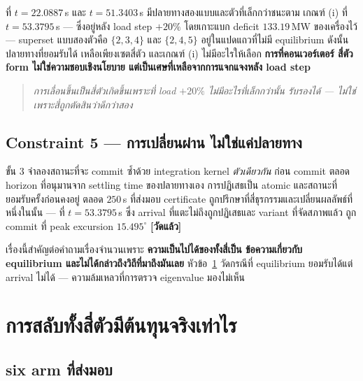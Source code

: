 \documentclass[12pt,a4paper]{article}
\theoremstyle{remark}
\newcommand{\measured}{\textcolor{ok}{\textbf{[วัดแล้ว]}}}
\begin{document}
ที่ $t=22.0887$\,s และ $t=51.3403$\,s มีปลายทางสองแบบและตัวที่เล็กกว่าชนะตาม
เกณฑ์ (i) ที่ $t=53.3795$\,s --- ซึ่งอยู่หลัง load step $+20\%$ โดยเกาะแบก
deficit $133.19$\,MW ของเครื่องไว้ --- superset แบบสองตัวคือ $\{2,3,4\}$ และ
$\{2,4,5\}$ อยู่ในแปดแถวที่ไม่มี equilibrium ดังนั้นปลายทางที่ยอมรับได้
เหลือเพียงเซตสี่ตัว และเกณฑ์ (i) ไม่มีอะไรให้เลือก \textbf{การที่คอนเวอร์เตอร์
สี่ตัว form ไม่ใช่ความชอบเชิงนโยบาย แต่เป็นเศษที่เหลือจากการแจกแจงหลัง
load step}

\begin{quote}\small\itshape
การเลื่อนขึ้นเป็นสี่ตัวเกิดขึ้นเพราะที่ load $+20\%$ ไม่มีอะไรที่เล็กกว่านั้น
รับรองได้ --- ไม่ใช่เพราะสี่ถูกตัดสินว่าดีกว่าสอง
\end{quote}

\subsection{Constraint 5 --- การเปลี่ยนผ่าน ไม่ใช่แค่ปลายทาง}

ขั้น 3 จำลองสถานะที่จะ commit ซ้ำด้วย integration kernel \emph{ตัวเดียวกัน}
ก่อน commit ตลอด horizon ที่อนุมานจาก settling time ของปลายทางเอง
การปฏิเสธเป็น atomic และสถานะที่ยอมรับครั้งก่อนคงอยู่ ตลอด $250$\,s
ที่ส่งมอบ certificate ถูกปรึกษาที่สี่ธุรกรรมและเปลี่ยนผลลัพธ์ที่หนึ่งในนั้น ---
ที่ $t=53.3795$\,s ซึ่ง arrival ที่แตะไม่ถึงถูกปฏิเสธและ variant ที่จัดสภาพแล้ว
ถูก commit ที่ peak excursion $15.495^{\circ}$ \measured

เรื่องนี้สำคัญต่อคำถามเรื่องจำนวนเพราะ \textbf{ความเป็นไปได้ของทั้งสี่เป็น
ข้อความเกี่ยวกับ equilibrium และไม่ได้กล่าวถึงวิถีที่มาถึงมันเลย}
หัวข้อ~\ref{sec:cost} วัดกรณีที่ equilibrium ยอมรับได้แต่ arrival ไม่ได้ ---
ความล้มเหลวที่การตรวจ eigenvalue มองไม่เห็น

\section{การสลับทั้งสี่ตัวมีต้นทุนจริงเท่าไร}\label{sec:cost}

\subsection{six arm ที่ส่งมอบ}
\end{document}
